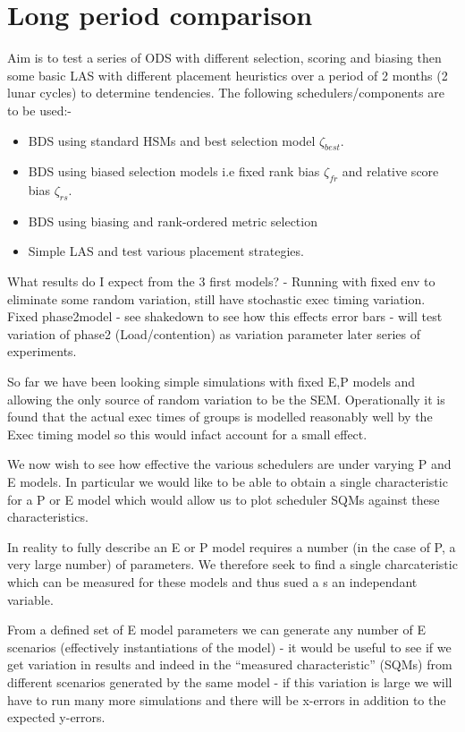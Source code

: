 \section{Long period comparison}
\label{sect:lts_study}
Aim is to test a series of ODS with different selection, scoring and biasing then some basic LAS with different placement heuristics over a period of 2 months (2 lunar cycles) to determine tendencies. The following schedulers/components are to be used:-

\begin{itemize}
\item BDS using standard HSMs and best selection model $\zeta_{best}$.
\item BDS using biased selection models i.e fixed rank bias $\zeta_{fr}$ and relative score bias $\zeta_{rs}$.
\item BDS using biasing and rank-ordered metric selection
\item Simple LAS and test various placement strategies.
\end{itemize}

What results do I expect from the 3 first models? - Running with fixed env to eliminate some random variation, still have stochastic exec timing variation. Fixed phase2model - see shakedown to see how this effects error bars - will test variation of phase2 (Load/contention) as variation parameter later series of experiments.

So far we have been looking simple simulations with fixed E,P models and allowing the only source of random variation to be the SEM. Operationally it is found that the actual exec times of groups is modelled reasonably well by the Exec timing model so this would infact account for a small effect.

We now wish to see how effective the various schedulers are under varying P and E models. In particular we would like to be able to obtain a single characteristic for a P or E model which would allow us to plot scheduler  SQMs against these characteristics.

In reality to fully describe an E or P model requires a number (in the case of P, a very large number) of parameters. We therefore seek to find a single charcateristic which can be measured for these models and thus sued a s an independant variable.

From a defined set of E model parameters we can generate any number of E scenarios (effectively instantiations of the model) - it would be useful to see if we get variation in results and indeed in the ``measured characteristic'' (SQMs) from different scenarios generated by the same model - if this variation is large we will have to run many more simulations and there will be x-errors in addition to the expected y-errors.

